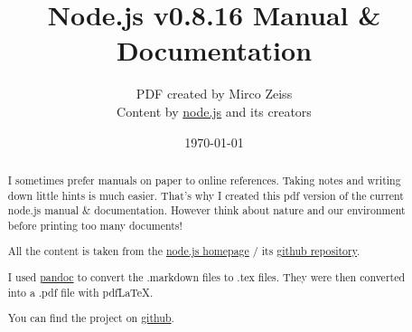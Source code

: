 \documentclass[10pt, a4paper, titlepage, oneside, plain]{article}
\begin{document}
	\title{Node.js v0.8.16 Manual \& Documentation}
	\author{PDF created by Mirco Zeiss\\Content by \href{http://www.nodejs.org}{node.js} and its creators}
	\date{\today}

	\maketitle

	\begin{abstract}
	I sometimes prefer manuals on paper to online references. Taking notes and writing down little hints is much easier. That's why I created this pdf version of the current node.js manual \& documentation. However think about nature and our environment before printing too many documents!

	All the content is taken from the \href{http://www.nodejs.org}{node.js homepage} / its \href{https://github.com/joyent/node}{github repository}.

	I used \href{http://johnmacfarlane.net/pandoc/}{pandoc} to convert the .markdown files to .tex files. They were then converted into a .pdf file with pdfLaTeX.

	You can find the project on \href{https://github.com/zeMirco/nodejs-pdf-docs}{github}.
	\end{abstract}

	\tableofcontents

	
	
	
	
	
	
	
	
	
	
	
	
	
	
				
	
					
	
	
	
	
	
	
	
	
	
\end{document}

